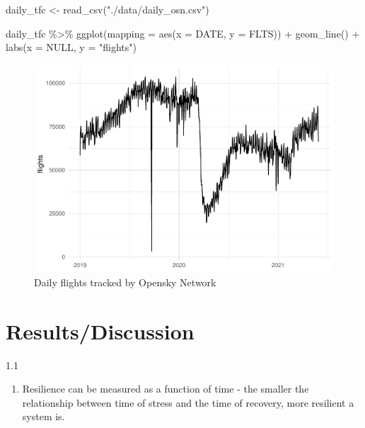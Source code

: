 \documentclass[conference,final,]{IEEEtran}
\makeatletter
\def\maxwidth{\ifdim\Gin@nat@width>\linewidth\linewidth
\else\Gin@nat@width\fi}
\let\Oldincludegraphics\includegraphics
\renewcommand{\includegraphics}[1]{\Oldincludegraphics[width=\maxwidth]{#1}}
\newenvironment{Shaded}{\begin{snugshade}}{\end{snugshade}}
\newcommand{\AttributeTok}[1]{\textcolor[rgb]{0.77,0.63,0.00}{#1}}
\newcommand{\ConstantTok}[1]{\textcolor[rgb]{0.00,0.00,0.00}{#1}}
\newcommand{\FunctionTok}[1]{\textcolor[rgb]{0.00,0.00,0.00}{#1}}
\newcommand{\NormalTok}[1]{#1}
\newcommand{\OtherTok}[1]{\textcolor[rgb]{0.56,0.35,0.01}{#1}}
\newcommand{\SpecialCharTok}[1]{\textcolor[rgb]{0.00,0.00,0.00}{#1}}
\newcommand{\StringTok}[1]{\textcolor[rgb]{0.31,0.60,0.02}{#1}}
\providecommand{\tightlist}{%
  \setlength{\itemsep}{0pt}\setlength{\parskip}{0pt}}
\makeatother
\begin{document}
\begin{Shaded}
\begin{Highlighting}[]
\NormalTok{daily\_tfc }\OtherTok{\textless{}{-}} \FunctionTok{read\_csv}\NormalTok{(}\StringTok{"./data/daily\_osn.csv"}\NormalTok{)}

\NormalTok{daily\_tfc }\SpecialCharTok{\%\textgreater{}\%}
  \FunctionTok{ggplot}\NormalTok{(}\AttributeTok{mapping =} \FunctionTok{aes}\NormalTok{(}\AttributeTok{x =}\NormalTok{ DATE, }\AttributeTok{y =}\NormalTok{ FLTS)) }\SpecialCharTok{+}
  \FunctionTok{geom\_line}\NormalTok{() }\SpecialCharTok{+}
  \FunctionTok{labs}\NormalTok{(}\AttributeTok{x =} \ConstantTok{NULL}\NormalTok{, }\AttributeTok{y =} \StringTok{"flights"}\NormalTok{)}
\end{Highlighting}
\end{Shaded}

\begin{figure}
\centering
\includegraphics{paper_files/figure-latex/osndaily-1.pdf}
\caption{\label{fig:osndaily}Daily flights tracked by Opensky Network}
\end{figure}

\hypertarget{resultsdiscussion}{%
\section{Results/Discussion}\label{resultsdiscussion}}

1.1

\begin{enumerate}
\def\labelenumi{\alph{enumi})}
\tightlist
\item
  Resilience can be measured as a function of time - the smaller the relationship between time of stress and the time of recovery, more resilient a system is.
\end{enumerate}
\end{document}
